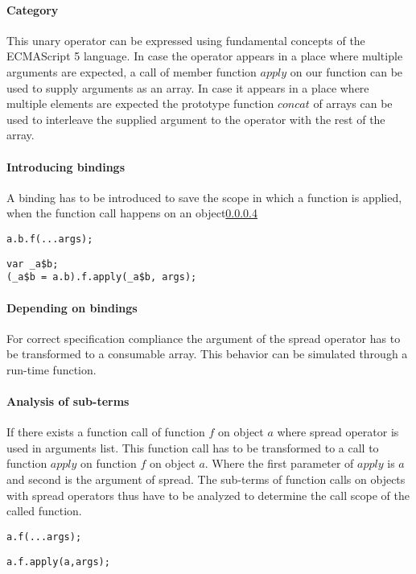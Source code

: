 \paragraph{Category}
This unary operator can be expressed using fundamental concepts of the ECMAScript 5 language. In case the operator appears in a place where multiple arguments are expected, a call of member function $apply$ on our function can be used to supply arguments as an array. In case it appears in a place where multiple elements are expected the prototype function $concat$ of arrays can be used to interleave the supplied argument to the operator with the rest of the array. 

\paragraph{Introducing bindings}
A binding has to be introduced to save the scope in which a function is applied, when the function call happens on an object\ref{spread-analysis-sub-terms}

\begin{lstlisting}
a.b.f(...args);
\end{lstlisting}
\begin{lstlisting}
var _a$b;
(_a$b = a.b).f.apply(_a$b, args);
\end{lstlisting}

\paragraph{Depending on bindings}
For correct specification compliance the argument of the spread operator has to be transformed to a consumable array. This behavior can be simulated through a run-time function.

\paragraph{Analysis of sub-terms} \label{spread-analysis-sub-terms}
If there exists a function call of function $f$ on object $a$ where spread operator is used in arguments list. This function call has to be transformed to a call to function $apply$ on function $f$ on object $a$. Where the first parameter of $apply$ is $a$ and second is the argument of spread. The sub-terms of function calls on objects with spread operators thus have to be analyzed to determine the call scope of the called function.

\begin{lstlisting}
a.f(...args);
\end{lstlisting}
\begin{lstlisting}[caption={apply function with correct $this$ scope}]
a.f.apply(a,args);
\end{lstlisting}

